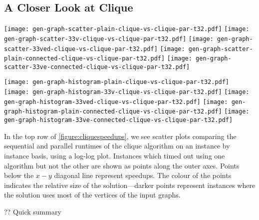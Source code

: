 \documentclass[sigconf]{acmart}
\begin{document}
\subsection{A Closer Look at Clique}

\begin{figure*}[p]
    \texttt{[image: gen-graph-scatter-plain-clique-vs-clique-par-t32.pdf]}
    \hfill
    \texttt{[image: gen-graph-scatter-33v-clique-vs-clique-par-t32.pdf]}
    \hfill
    \texttt{[image: gen-graph-scatter-33ved-clique-vs-clique-par-t32.pdf]}
    \hfill
    \texttt{[image: gen-graph-scatter-plain-connected-clique-vs-clique-par-t32.pdf]}
    \hfill
    \texttt{[image: gen-graph-scatter-33ve-connected-clique-vs-clique-par-t32.pdf]}

    \vspace*{1em}

    \texttt{[image: gen-graph-histogram-plain-clique-vs-clique-par-t32.pdf]}
    \hfill
    \texttt{[image: gen-graph-histogram-33v-clique-vs-clique-par-t32.pdf]}
    \hfill
    \texttt{[image: gen-graph-histogram-33ved-clique-vs-clique-par-t32.pdf]}
    \hfill
    \texttt{[image: gen-graph-histogram-plain-connected-clique-vs-clique-par-t32.pdf]}
    \hfill
    \texttt{[image: gen-graph-histogram-33ve-connected-clique-vs-clique-par-t32.pdf]}

    \caption{On the top row, per-instance speedups, using the clique algorithm. The $x$-axis is
    sequential performance and the $y$-axis is 32 threaded performance, so points below the diagonal
    line represent a speedup. Darker points represent instances where the solution is relatively
    large compared to the order of the input graphs. Below, histograms plotting the distribution of
    speedups for instances whose sequential runtime was at least 500 milliseconds, and below the
    timeout.}\label{figure:cliquespeedups}
\end{figure*}

In the top row of \cref{figure:cliquespeedups}, we see scatter plots comparing the sequential and
parallel runtimes of the clique algorithm on an instance by instance basis, using a log-log plot.
Instances which timed out using one algorithm but not the other are shown as points along the outer
axes. Points below the $x{-}y$ diagonal line represent speedups. The colour of the points indicates
the relative size of the solution---darker points represent instances where the solution uses most
of the vertices of the input graphs.

?? Quick summary
\end{document}
